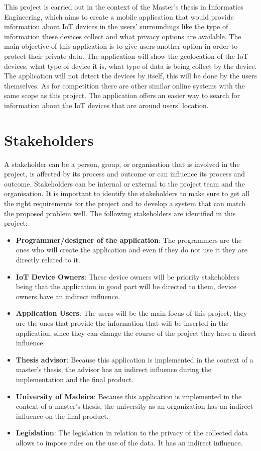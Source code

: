 \documentclass{scrreprt}
\begin{document}
This project is carried out in the context of the Master's thesis in Informatics
Engineering, which aims to create a mobile application that would provide
information about IoT devices in the users' surroundings like the type of information
these devices collect and what privacy options are available. The main objective
of this application is to give users another option in order to protect
their private data. The application will show the geolocation of the IoT
devices, what type of device it is, what type of data is being collect by
the device. The application will not detect the devices by itself, this will
be done by the users themselves. As for competition there are other similar
online systems with the same scope as this project. The application offers
an easier way to search for information about the IoT devices that are around users'
location.

\section{Stakeholders}

A stakeholder can be a person, group, or organisation that is involved in
the project, is affected by its process and outcome or can influence its
process and outcome. Stakeholders can be internal or external to the project
team and the organisation. \cite{fulton2017chapter}
\newline
It is important to identify the stakeholders to make sure to get all the
right requirements for the project and to develop a system that can match
the proposed problem well.
\newline
The following stakeholders are identified in this project:
\begin{itemize}
    \item \textbf{Programmer/designer of the application}: The programmers are the ones who will create the application and even if they do not use it they are directly related to it.
    \item \textbf{IoT Device Owners}: These device owners will be priority stakeholders being that the application in good part will be directed to them, device owners have an indirect influence.
    \item \textbf{Application Users}: The users will be the main focus of this project, they are the ones that provide the information that will be inserted in the application, since they can change the course of the project they have a direct influence.
    \item \textbf{Thesis advisor}: Because this application is implemented in the context of a master's thesis, the advisor has an indirect influence during the implementation and the final product.
    \item \textbf{University of Madeira}: Because this application is implemented in the context of a master's thesis, the university as an organization has an indirect influence on the final product.
    \item \textbf{Legislation}: The legislation in relation to the privacy of the collected data allows to impose rules on the use of the data. It has an indirect influence.
\end{itemize}
\end{document}
